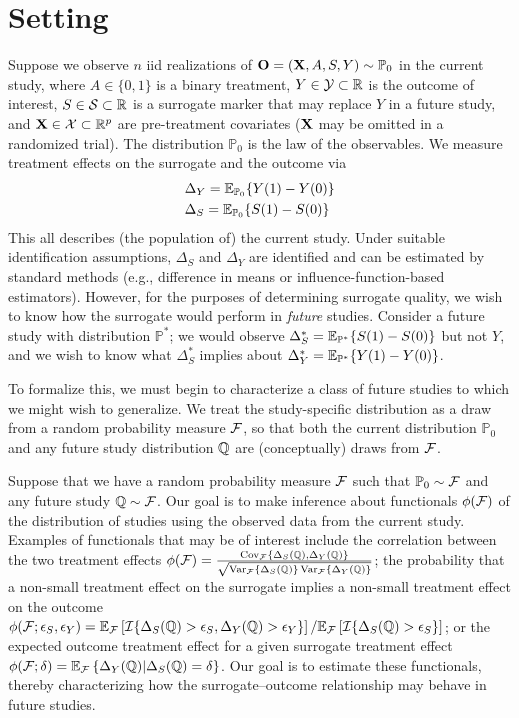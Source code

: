 \documentclass{article}
\newcommand{\PP}{\mathbb{P}}
\begin{document}
\section{Setting}\label{sec:setting}
Suppose we observe $n$ iid realizations of $\bO = (\bX, A, S, Y) \sim \PP_0$ in the current study, where $A \in \{0, 1\}$ is a binary treatment, $Y \in \mathcal{Y} \subset \mathbb{R}$ is the outcome of interest, $S \in \mathcal{S} \subset \mathbb{R}$ is a surrogate marker that may replace $Y$ in a future study, and $\mathbf{X} \in \mathcal{X} \subset \mathbb{R}^p$ are pre-treatment covariates ($\mathbf{X}$ may be omitted in a randomized trial). The distribution $\PP_0$ is the law of the observables. We measure treatment effects on the surrogate and the outcome via
\begin{align*}
    &\Delta_Y = \E_{\PP_0}\{Y(1) - Y(0)\}\\
    &\Delta_S = \E_{\PP_0}\{S(1) - S(0)\}
\end{align*}
This all describes (the population of) the current study. Under suitable identification assumptions, $\Delta_S$ and $\Delta_Y$ are identified and can be estimated by standard methods (e.g., difference in means or influence-function-based estimators). However, for the purposes of determining surrogate quality, we wish to know how the surrogate would perform in \emph{future} studies. Consider a future study with distribution $\PP^*$; we would observe $\Delta^*_S = \E_{\PP^*}\{S(1) - S(0)\}$ but not $Y$, and we wish to know what $\Delta^*_S$ implies about $\Delta^*_Y = \E_{\PP^*}\{Y(1) - Y(0)\}$. 

To formalize this, we must begin to characterize a class of future studies to which we might wish to generalize. We treat the study-specific distribution as a draw from a random probability measure $\mathcal{F}$, so that both the current distribution $\PP_0$ and any future study distribution $\mathbb{Q}$ are (conceptually) draws from $\mathcal{F}$.

Suppose that we have a random probability measure $\mathcal{F}$ such that $\PP_0 \sim \cF$ and any future study $\mathbb{Q} \sim \mathcal{F}$. Our goal is to make inference about functionals $\phi(\mathcal{F})$ of the distribution of studies using the observed data from the current study. Examples of functionals that may be of interest include the correlation between the two treatment effects $\phi(\mathcal{F}) = \frac{\operatorname{Cov}_{\mathcal{F}}\{\Delta_S(\mathbb{Q}), \Delta_Y(\mathbb{Q})\}}{\sqrt{\operatorname{Var}_{\mathcal{F}}\{\Delta_S(\mathbb{Q})\}\operatorname{Var}_{\mathcal{F}}\{\Delta_Y(\mathbb{Q})\}}}$; the probability that a non-small treatment effect on the surrogate implies a non-small treatment effect on the outcome $\phi(\mathcal{F}; \epsilon_S, \epsilon_Y) = \mathbb{E}_{\mathcal{F}}\left[ \mathcal{I}\{ \Delta_S(\mathbb{Q}) > \epsilon_S, \Delta_Y(\mathbb{Q}) > \epsilon_Y\} \right] / \mathbb{E}_{\mathcal{F}}\left[ \mathcal{I}\{ \Delta_S(\mathbb{Q}) > \epsilon_S\} \right]$; or the expected outcome treatment effect for a given surrogate treatment effect $\phi(\mathcal{F}; \delta) = \mathbb{E}_{\mathcal{F}}\left\{\Delta_Y(\mathbb{Q}) | \Delta_S(\mathbb{Q}) = \delta\right\}$. Our goal is to estimate these functionals, thereby characterizing how the surrogate--outcome relationship may behave in future studies.
\end{document}

